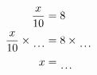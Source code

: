 \documentclass[varwidth]{standalone}
\begin{document}
    \begin{varwidth}{0.25\paperwidth}
    \begin{align*}
    \frac{x}{10} &= 8\\
    \frac{x}{10} \times{\dotuline{\hspace{4mm}}} &= 8 \times{\dotuline{\hspace{4mm}}}\\
    x &= \dotuline{\hspace{4mm}}\\
\end{align*}
\end{varwidth}
\end{document}
